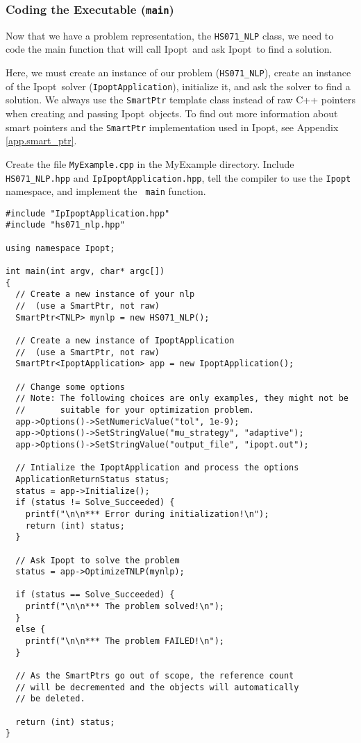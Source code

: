 \documentclass[10pt]{article}
\newcommand{\Ipopt}{{\sc Ipopt}}
\begin{document}
\subsubsection{Coding the Executable (\texttt{main})}
Now that we have a problem representation, the {\tt HS071\_NLP} class,
we need to code the main function that will call \Ipopt\ and ask \Ipopt\
to find a solution.

Here, we must create an instance of our problem ({\tt HS071\_NLP}),
create an instance of the \Ipopt\ solver (\texttt{IpoptApplication}),
initialize it, and ask the solver to find a solution. We always use
the \texttt{SmartPtr} template class instead of raw C++ pointers when
creating and passing \Ipopt\ objects. To find out more information
about smart pointers and the {\tt SmartPtr} implementation used in
\Ipopt, see Appendix \ref{app.smart_ptr}.

Create the file {\tt MyExample.cpp} in the MyExample directory.
Include {\tt HS071\_NLP.hpp} and {\tt IpIpoptApplication.hpp}, tell
the compiler to use the {\tt Ipopt} namespace, and implement the {\tt
  main} function.

\begin{footnotesize}
\begin{verbatim}
#include "IpIpoptApplication.hpp"
#include "hs071_nlp.hpp"

using namespace Ipopt;

int main(int argv, char* argc[])
{
  // Create a new instance of your nlp 
  //  (use a SmartPtr, not raw)
  SmartPtr<TNLP> mynlp = new HS071_NLP();

  // Create a new instance of IpoptApplication
  //  (use a SmartPtr, not raw)
  SmartPtr<IpoptApplication> app = new IpoptApplication();

  // Change some options
  // Note: The following choices are only examples, they might not be
  //       suitable for your optimization problem.
  app->Options()->SetNumericValue("tol", 1e-9);
  app->Options()->SetStringValue("mu_strategy", "adaptive");
  app->Options()->SetStringValue("output_file", "ipopt.out");

  // Intialize the IpoptApplication and process the options
  ApplicationReturnStatus status;
  status = app->Initialize();
  if (status != Solve_Succeeded) {
    printf("\n\n*** Error during initialization!\n");
    return (int) status;
  }

  // Ask Ipopt to solve the problem
  status = app->OptimizeTNLP(mynlp);

  if (status == Solve_Succeeded) {
    printf("\n\n*** The problem solved!\n");
  }
  else {
    printf("\n\n*** The problem FAILED!\n");
  }

  // As the SmartPtrs go out of scope, the reference count
  // will be decremented and the objects will automatically 
  // be deleted.

  return (int) status;
}
\end{verbatim} 
\end{footnotesize}
\end{document}
